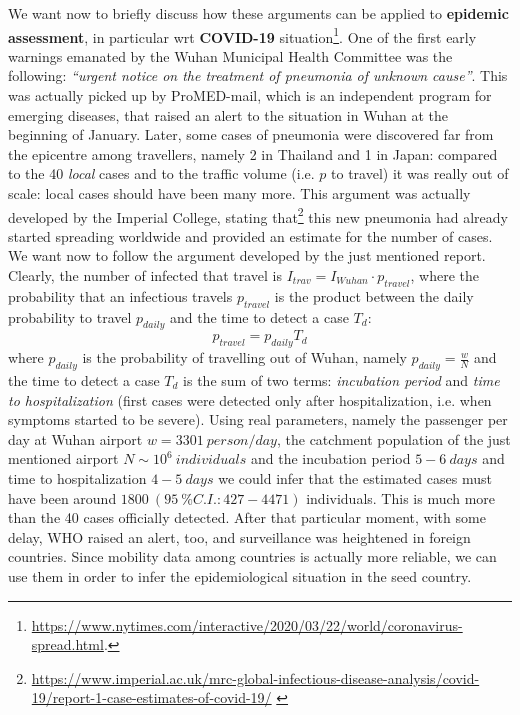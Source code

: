 \documentclass[../main/main.tex]{subfiles}
\begin{document}
We want now to briefly discuss how these arguments can be applied to \textbf{epidemic assessment}, in particular wrt \textbf{COVID-19} situation\footnote{\url{https://www.nytimes.com/interactive/2020/03/22/world/coronavirus-spread.html}\label{imp_college_ref}.}. One of the first early warnings emanated by the Wuhan Municipal Health Committee was the following: \emph{“urgent notice on the treatment of pneumonia of unknown cause”}. This was actually picked up by ProMED-mail, which is an independent program for emerging diseases, that raised an alert to the situation in Wuhan at the beginning of January. Later, some cases of pneumonia were discovered far from the epicentre among travellers, namely 2 in Thailand and 1 in Japan: compared to the 40 \textit{local} cases and to the traffic volume (i.e. $p$ to travel) it was really out of scale: local cases should have been many more. This argument was actually developed by the Imperial College, stating that\footnote{\url{https://www.imperial.ac.uk/mrc-global-infectious-disease-analysis/covid-19/report-1-case-estimates-of-covid-19/} \label{footnote:imp_college_ref}} this new pneumonia had already started spreading worldwide and provided an estimate for the number of cases. We want now to follow the argument developed by the just mentioned report. Clearly, the number of infected that travel is $I_{trav} = I_{Wuhan}\cdot p_{travel}$, where the probability that an infectious travels $p_{travel}$ is the product between the daily probability to travel $p_{daily}$ and the time to detect a case $T_d$:
\begin{equation}
    p_{travel} = p_{daily} T_d
\end{equation}
where $p_{daily}$ is the probability of travelling out of Wuhan, namely $p_{daily} = \frac{w}{N}$ and the time to detect a case $T_d$ is the sum of two terms: \textit{incubation period} and \textit{time to hospitalization} (first cases were detected only after hospitalization, i.e. when symptoms started to be severe).
Using real parameters, namely the passenger per day at Wuhan airport $w = 3301\ person/day$, the catchment population of the just mentioned airport $N\sim 10^6\ individuals$ and the incubation period $5-6\ days$ and time to hospitalization $4-5\ days$ we could infer that the estimated cases must have been around $1800\ (95\ \% C.I. : 427 - 4471)$ individuals. This is much more than the 40 cases officially detected. After that particular moment, with some delay, WHO raised an alert, too, and surveillance was heightened in foreign countries. Since mobility data among countries is actually more reliable, we can use them in order to infer the epidemiological situation in the seed country.
\end{document}
